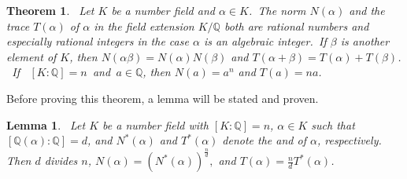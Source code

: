 \documentclass[12pt]{article}
\newtheorem*{lem*}{Lemma}
\newtheorem{thm}{Theorem}
\begin{document}
\begin{thm}
\, Let $K$ be a number field and $\alpha \in K$.\, The norm $N(\alpha)$ and the trace $T(\alpha)$ of $\alpha$ in the field extension $K/\mathbb{Q}$ both are rational numbers and especially rational integers in the case $\alpha$ is an algebraic integer.\, If $\beta$ is another element of $K$, then $N(\alpha\beta) = N(\alpha)N(\beta)$ and $T(\alpha+\beta) = T(\alpha)+T(\beta)$. \, If \,
$[K\!:\!\mathbb{Q}] = n$\, and\, $a\in\mathbb{Q}$, then $N(a) = a^n$ and $T(a) = na$.
\end{thm}

Before proving this theorem, a lemma will be stated and proven.

\begin{lem*}
\, Let $K$ be a number field with $[K\!:\!\mathbb{Q}]=n$, $\alpha \in K$ such that $[\mathbb{Q}(\alpha)\!:\!\mathbb{Q}]=d$, and $N^*(\alpha)$ and $T^*(\alpha)$ denote the  and  of $\alpha$, respectively. \, Then $d$ divides $n$, $\displaystyle N(\alpha)=(N^*(\alpha))^{\frac{n}{d}},$ and $\displaystyle T(\alpha)=\frac{n}{d}T^*(\alpha)$.
\end{lem*}
\end{document}
